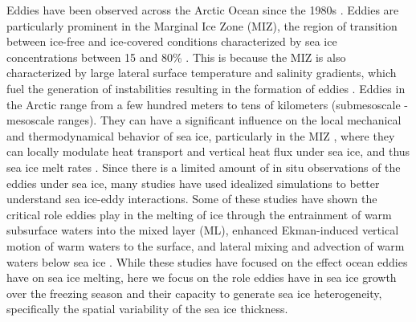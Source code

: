 \documentclass[draft]{agujournal2019}
\begin{document}
Eddies have been observed across the Arctic Ocean since the 1980s \citep{Johannessen_eddy_1987, Manley_eddies_1985}. Eddies are particularly prominent in the Marginal Ice Zone (MIZ), the region of transition between ice-free and ice-covered conditions characterized by sea ice concentrations between 15 and 80\% \citep{Kozlov_eddies_2020}. This is because the MIZ is also characterized by large lateral surface temperature and salinity gradients, which fuel the generation of instabilities resulting in the formation of eddies  \citep{Brenner_front_2020, Manucharyan_Ice_dynamics_2017, Lu_mixing_2015}. 
Eddies in the Arctic range from a few hundred meters to tens of kilometers (submesoscale - mesoscale ranges). They can have a significant influence on the local mechanical and thermodynamical behavior of sea ice, particularly in the MIZ \citep{Footprints_Manucharyan_2022}, where they can locally modulate heat transport and vertical heat flux under sea ice, and thus sea ice melt rates \citep{Appen_submesoscale_2018, Cassianides_eddy_2023}. Since there is a limited amount of in situ observations of the eddies under sea ice, many studies have used idealized simulations to better understand sea ice-eddy interactions. Some of these studies have shown the critical role eddies play in the melting of ice through the entrainment of warm subsurface waters into the mixed layer (ML), enhanced Ekman-induced vertical motion of warm waters to the surface, and lateral mixing and advection of warm waters below sea ice \citep{Gupta_melt_2020, Horvat_ice_2018, Manucharyan_Ice_dynamics_2017}. While these studies have focused on the effect ocean eddies have on sea ice melting, here we focus on the role eddies have in sea ice growth over the freezing season and their capacity to generate sea ice heterogeneity, specifically the spatial variability of the sea ice thickness. 
\end{document}
